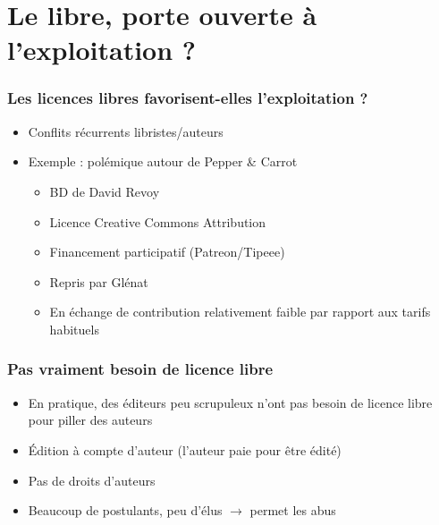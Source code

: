 \documentclass[11pt]{beamer}
\begin{document}
\section{Le libre, porte ouverte à l'exploitation ?}

\begin{frame}
  \frametitle{Les licences libres favorisent-elles l'exploitation ?}
    \begin{itemize}
    \item Conflits récurrents libristes/auteurs
    \item Exemple : polémique autour de Pepper \& Carrot
      \begin{itemize}
      \item BD de David Revoy
      \item Licence Creative Commons Attribution
      \item Financement participatif (Patreon/Tipeee)
      \item Repris par Glénat
      \item En échange de contribution relativement faible par rapport
        aux tarifs habituels
        \end{itemize}
    \end{itemize}
            \begin{center}
    \end{center}
\end{frame}

\begin{frame}
  \frametitle{Pas vraiment besoin de licence libre}
    \begin{itemize}
    \item En pratique, des éditeurs peu scrupuleux n'ont pas besoin de licence libre
      pour piller des auteurs
    \item Édition à compte d'auteur (l'auteur paie pour être édité)
    \item Pas de droits d'auteurs
    \item Beaucoup de postulants, peu d'élus $\rightarrow$ permet les abus
    \end{itemize}
\end{frame}
\end{document}
